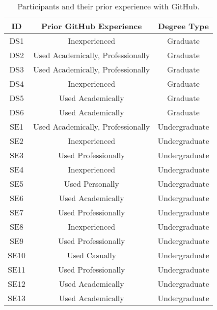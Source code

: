 \begin{table}[h]
    \vspace{1pt}
        \caption{Participants and their prior experience with GitHub.}\label{table:interviews:students}
    \vspace{1pt}
    \begin{center}
        \begin{tabular}{c | c | c}
            \hline
            ID & Prior GitHub Experience & Degree Type \\
            \hline
            DS1 & Inexperienced & Graduate \\ \hline
            DS2 & Used Academically, Professionally & Graduate \\ \hline
            DS3 & Used Academically, Professionally & Graduate \\ \hline
            DS4 & Inexperienced & Graduate \\ \hline
            DS5 & Used Academically & Graduate \\ \hline
            DS6 & Used Academically & Graduate \\ \hline
            SE1 & Used Academically, Professionally & Undergraduate \\ \hline
            SE2 & Inexperienced & Undergraduate \\ \hline
            SE3 & Used Professionally & Undergraduate \\ \hline
            SE4 & Inexperienced & Undergraduate \\ \hline
            SE5 & Used Personally & Undergraduate \\ \hline
            SE6 & Used Academically & Undergraduate \\ \hline
            SE7 & Used Professionally & Undergraduate \\ \hline
            SE8 & Inexperienced & Undergraduate \\ \hline
            SE9 & Used Professionally & Undergraduate \\ \hline
            SE10 & Used Casually & Undergraduate \\ \hline
            SE11 & Used Professionally & Undergraduate \\ \hline
            SE12 & Used Academically & Undergraduate \\ \hline
            SE13 & Used Academically & Undergraduate \\ \hline
        \end{tabular}
    \end{center}
\end{table}

